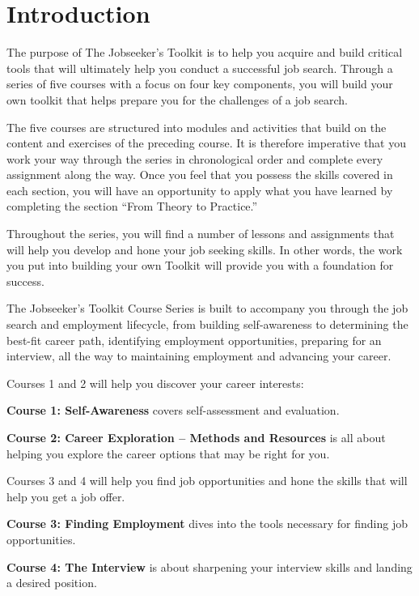\hypertarget{intro}{}\chapter*{Introduction}\label{intro}
\renewcommand{\cftchapleader}{\cftdotfill{\cftdotsep}}

\pagestyle{fancyplain}
\fancyfoot[C]{\thepage}
\noindent\makebox[\textwidth]{\rule{\linewidth}{0.4pt}}
The purpose of The Jobseeker's Toolkit is to help you acquire and build critical tools that will ultimately help you conduct a successful job search. Through a series of five courses with a focus on four key components, you will build your own toolkit that helps prepare you for the challenges of a job search.

The five courses are structured into modules and activities that build on the content and exercises of the preceding course. It is therefore imperative that you work your way through the series in chronological order and complete every assignment along the way. Once you feel that you possess the skills covered in each section, you will have an opportunity to apply what you have learned by completing the section “From Theory to Practice.”

Throughout the series, you will find a number of lessons and assignments that will help you develop and hone your job seeking skills. In other words, the work you put into building your own Toolkit will provide you with a foundation for success.

The Jobseeker’s Toolkit Course Series is built to accompany you through the job search and employment lifecycle, from building self-awareness to determining the best-fit career path, identifying employment opportunities, preparing for an interview, all the way to maintaining employment and advancing your career.

Courses 1 and 2 will help you discover your career interests:

\textbf{Course 1: Self-Awareness} covers self-assessment and evaluation.

\textbf{Course 2: Career Exploration – Methods and Resources} is all about helping you explore the career options that may be right for you.

Courses 3 and 4 will help you find job opportunities and hone the skills that will help you get a job offer.

\textbf{Course 3: Finding Employment} dives into the tools necessary for finding job opportunities.

\textbf{Course 4: The Interview} is about sharpening your interview skills and landing a desired position.


